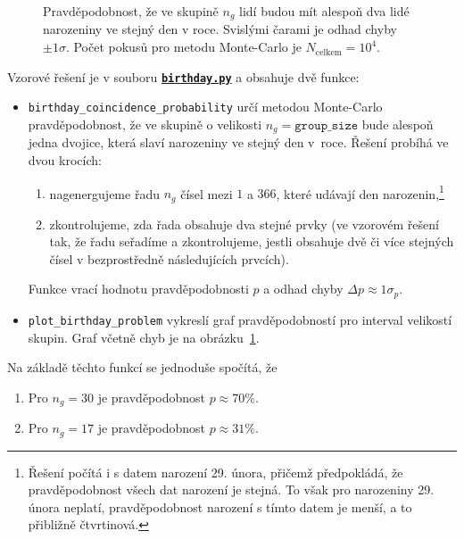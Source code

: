 \documentclass[a4paper,11pt,twoside]{article}
\def\code#1{\textnormal{\texttt{#1}}}
\def\ghfile#1#2{\textnormal{\textbf{\texttt{\href{https://github.com/PavelStransky/PCInPhysics/blob/main/#1#2}{#2}}}}}
\theoremstyle{red}
\theoremstyle{green}
\begin{document}
    \begin{solution}
        \begin{figure}[!htbp]
            \centering{}
            \caption{
                \protect\small
                Pravděpodobnost, že ve skupině $n_{g}$ lidí budou mít alespoň dva lidé narozeniny ve stejný den v roce.
                Svislými čarami je odhad chyby $\pm1\sigma$.
                Počet pokusů pro metodu Monte-Carlo je $N_{\text{celkem}}=10^{4}$.
            }
            \label{fig:BirthdayProblem}
        \end{figure}

        Vzorové řešení je v souboru \ghfile{python/montecarlo/}{birthday.py} a obsahuje dvě funkce:
        \begin{itemize}
            \item \code{birthday_coincidence_probability} 
                určí metodou Monte-Carlo pravděpodobnost, že ve skupině o velikosti $n_{g}=\mathtt{group\_size}$ bude alespoň jedna dvojice, která slaví narozeniny ve stejný den v~roce.
                Řešení probíhá ve dvou krocích: 
                \begin{enumerate}
                    \item nagenergujeme řadu $n_{g}$ čísel mezi $1$ a $366$, které udávají den narozenin,\footnote{
                        Řešení počítá i s datem narození 29. února, přičemž předpokládá, že pravděpodobnost všech dat narození je stejná.
                        To však pro narozeniny 29. února neplatí, pravděpodobnost narození s tímto datem je menší, a to přibližně čtvrtinová.
                    }
                    \item zkontrolujeme, zda řada obsahuje dva stejné prvky (ve vzorovém řešení tak, že řadu seřadíme a zkontrolujeme, jestli obsahuje dvě či více stejných čísel v bezprostředně následujících prvcích).
                \end{enumerate}
                Funkce vrací hodnotu pravděpodobnosti $p$ a odhad chyby $\Delta p\approx1\sigma_{p}$.
            \item \code{plot_birthday_problem}
                vykreslí graf pravděpodobností pro interval velikostí skupin.
                Graf včetně chyb je na obrázku~\ref{fig:BirthdayProblem}.
        \end{itemize}
        
        Na základě těchto funkcí se jednoduše spočítá, že
        \begin{enumerate}
            \item Pro $n_{g}=30$ je pravděpodobnost $p\approx70\%$.
            \item Pro $n_{g}=17$ je pravděpodobnost $p\approx31\%$. 
        \end{enumerate}


\end{solution}
\end{document}

